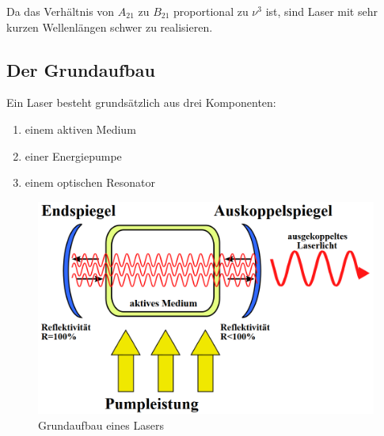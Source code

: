 Da das Verhältnis von $A_{21}$ zu $B_21$ proportional zu $\nu^3$ ist, sind Laser mit sehr kurzen Wellenlängen schwer zu realisieren.

\subsection{Der Grundaufbau}

Ein Laser besteht grundsätzlich aus drei Komponenten:
\begin{enumerate}
\item einem aktiven Medium
\item einer Energiepumpe
\item einem optischen Resonator
\end{enumerate}

\vspace{1cm}

\begin{figure}[here]
\centering
\includegraphics[scale=0.2]{img/HNL3.png}
\caption{Grundaufbau eines Lasers}
\begin{center}
\end{center}
\end{figure}

